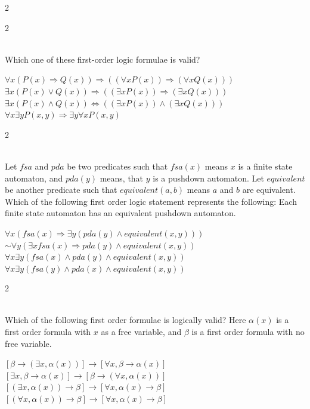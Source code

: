 \documentclass[12pt]{exam}
\begin{document}
\begin{questions}
\begin{multicols*}{2}
\end{multicols*}
\vspace{0.6cm}
\newpage
\begin{multicols*}{2}

 \\[0.2cm]
{\Large Which one of these first-order logic formulae is valid?}
\begin{choices}
  \choice $\forall x(P(x) \Rightarrow Q(x)) \Rightarrow ((\forall xP(x)) \Rightarrow (\forall xQ(x)))$
  \choice $\exists x(P(x) \vee Q(x)) \Rightarrow ((\exists xP(x)) \Rightarrow (\exists xQ(x)))$
  \choice $\exists x(P(x) \wedge Q(x)) \Leftrightarrow ((\exists xP(x)) \wedge (\exists xQ(x)))$
  \choice $\forall x \exists y P(x, y) \Rightarrow \exists y \forall x P(x, y)$
\end{choices}

\end{multicols*}
\vspace{0.6cm}
\newpage
\begin{multicols*}{2}

 \\[0.2cm]
{\Large Let $fsa$ and $pda$ be two predicates such that $fsa(x)$ means $x$ is a finite state automaton, and $pda(y)$ means, that $y$ is a pushdown automaton. Let $equivalent$ be another predicate such that $equivalent (a, b)$ means $a$ and $b$ are equivalent. Which of the following first order logic statement represents the following:\newline
Each finite state automaton has an equivalent pushdown automaton.}
\begin{choices}
  \choice $\forall x (fsa(x) \Rightarrow \exists y (pda(y) \wedge equivalent (x, y)))$
  \choice $\sim \forall y (\exists x fsa(x) \Rightarrow pda(y) \wedge equivalent (x, y))$
  \choice $\forall x \exists y (fsa(x) \wedge pda(y) \wedge equivalent (x, y))$
  \choice $\forall x \exists y (fsa(y) \wedge pda(x) \wedge equivalent (x, y))$
\end{choices}

\end{multicols*}
\vspace{0.6cm}
\newpage
\begin{multicols*}{2}

 \\[0.2cm]
{\Large Which of the following first order formulae is logically valid? Here $\alpha(x)$ is a first order formula with $x$ as a free variable, and $\beta$ is a first order formula with no free variable.}
\begin{choices}
  \choice $[\beta \rightarrow (\exists x, \alpha(x))] \rightarrow [\forall x, \beta \rightarrow \alpha(x)]$
  \choice $[\exists x, \beta \rightarrow \alpha(x)] \rightarrow [\beta \rightarrow (\forall x, \alpha(x))]$
  \choice $[(\exists x, \alpha(x)) \rightarrow \beta] \rightarrow [\forall x, \alpha(x) \rightarrow \beta]$
  \choice $[(\forall x, \alpha(x)) \rightarrow \beta] \rightarrow [\forall x, \alpha(x) \rightarrow \beta]$
\end{choices}


\end{multicols*}
\end{questions}
\end{document}

